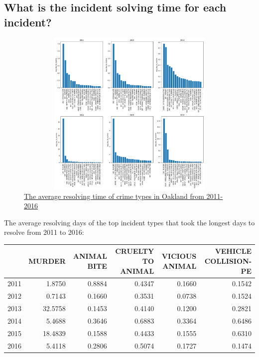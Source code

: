 \documentclass{article} %
\begin{document}
\subsection{What is the incident solving time for each incident?}


\begin{figure}[H]
	\begin{center}
		\includegraphics[height=8cm, width=15cm]{5.png}
	\end{center}
	\caption{\hyperref[appendix:plot4]{The average resolving time of crime types in Oakland from 2011-2016}}
\end{figure}


The average resolving days of the top incident types that took the longest days to resolve from 2011 to 2016:

\begin{center}
\begin{tabular}{|l|r|r|r|r|r|}
	\toprule
	 &   MURDER &  ANIMAL BITE &  CRUELTY TO ANIMAL &  VICIOUS ANIMAL &  VEHICLE COLLISION-PE \\
	\midrule
	2011 &   1.8750 &       0.8884 &             0.4347 &          0.1660 &                0.1542 \\
	2012 &   0.7143 &       0.1660 &             0.3531 &          0.0738 &                0.1524 \\
	2013 &  32.5758 &       0.1453 &             0.4140 &          0.1200 &                0.2821 \\
	2014 &   5.4688 &       0.3646 &             0.6883 &          0.3364 &                0.6486 \\
	2015 &  18.4839 &       0.1588 &             0.4433 &          0.1555 &                0.6310 \\
	2016 &   5.4118 &       0.2806 &             0.5074 &          0.1727 &                0.1474 \\
	\bottomrule
\end{tabular}
\end{center}
\end{document}
